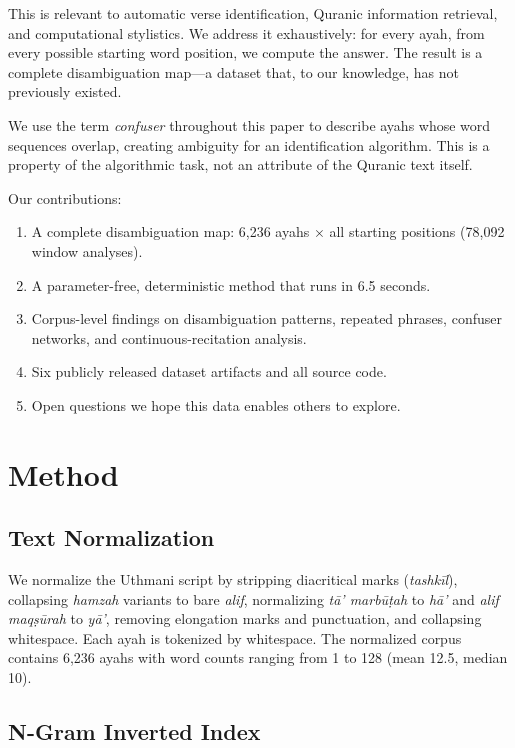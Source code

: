 \documentclass[11pt,a4paper]{article}
\begin{document}
This is relevant to automatic verse identification, Quranic information retrieval, and computational stylistics.
We address it exhaustively: for every ayah, from every possible starting word position, we compute the answer.
The result is a complete disambiguation map---a dataset that, to our knowledge, has not previously existed.

We use the term \emph{confuser} throughout this paper to describe ayahs whose word sequences overlap, creating ambiguity for an identification algorithm.
This is a property of the algorithmic task, not an attribute of the Quranic text itself.

Our contributions:
\begin{enumerate}
  \item A complete disambiguation map: 6{,}236 ayahs $\times$ all starting positions (78{,}092 window analyses).
  \item A parameter-free, deterministic method that runs in 6.5 seconds.
  \item Corpus-level findings on disambiguation patterns, repeated phrases, confuser networks, and continuous-recitation analysis.
  \item Six publicly released dataset artifacts and all source code.
  \item Open questions we hope this data enables others to explore.
\end{enumerate}

\section{Method}
\label{sec:method}

\subsection{Text Normalization}

We normalize the Uthmani script by stripping diacritical marks (\emph{tashk\=il}), collapsing \emph{hamzah} variants to bare \emph{alif}, normalizing \emph{t\=a' marb\=u\d{t}ah} to \emph{h\=a'} and \emph{alif maq\d{s}\=urah} to \emph{y\=a'}, removing elongation marks and punctuation, and collapsing whitespace.
Each ayah is tokenized by whitespace.
The normalized corpus contains 6{,}236 ayahs with word counts ranging from 1 to 128 (mean 12.5, median 10).

\subsection{N-Gram Inverted Index}
\end{document}
